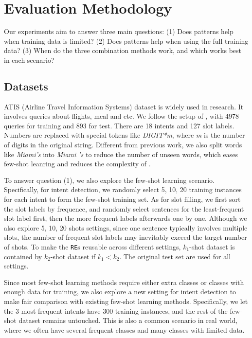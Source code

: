 \section{Evaluation Methodology}
Our experiments aim to answer three main questions: (1) Does \RE patterns help when training data is limited? (2) Does \RE patterns help when using the full training data? (3) When do the three combination methods work, and which works best in each scenario?

\subsection{Datasets}
\label{sec_datasest}
ATIS (Airline Travel Information Systems) dataset \cite{hemphill1990atis} is widely used in \NLU research. It involves queries about flights, meal and etc. We follow the setup of \cite{liu2016attention}, with 4978 queries for training and 893 for test. There are 18 intents and 127 slot labels. Numbers are replaced with special tokens like \emph{DIGIT*m}, where \emph{m} is the number of digits in the original string. Different from previous work, we also split words like \emph{Miami's} into \emph{Miami 's} to reduce the number of unseen words, which eases few-shot leanring and reduces the complexity of \RE.

To answer question (1), we also explore the few-shot learning scenario. Specifically, for intent detection, we randomly select 5, 10, 20 training instances for each intent to form the few-shot training set. As for slot filling, we first sort the slot labels by frequence, and randomly select sentences for the least-frequent slot label first, then the more frequent labels afterwards one by one. Although we also explore 5, 10, 20 shots settings, since one sentence typically involves multiple slots, the number of frequent slot labels may inevitably exceed the target number of shots.
To make the \texttt{RE}s reusable across different settings, $k_1$-shot dataset is contained by $k_2$-shot dataset if $k_1 < k_2$. 
The original test set are used for all settings.

Since most few-shot learning methods require either extra classes or classes with enough data for training, we also explore a new setting for intent detection to make fair comparison with existing few-shot learning methods. Specifically, we let the 3 most frequent intents have 300 training instances, and the rest of the few-shot dataset remains untouched.
This is also a common scenario in real world, where we often have several frequent classes and many classes with limited data.

